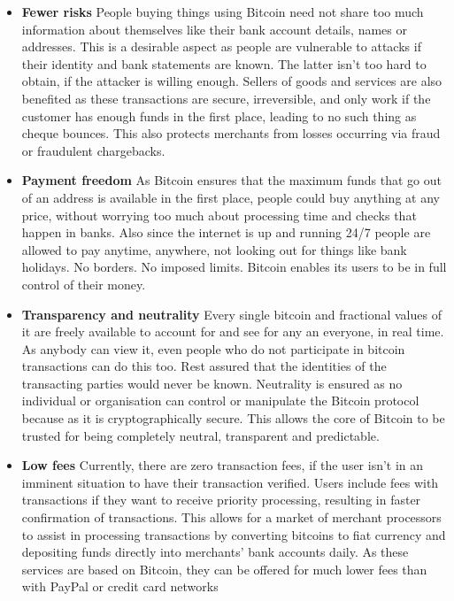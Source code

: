 \documentclass[12pt,a4paper]{report}
\begin{document}
\begin{justify}
\begin{itemize}
 \item \textbf{Fewer risks} \newline People buying things using Bitcoin need not share too much information about themselves like their bank account details, names or addresses. This is a desirable aspect as people are vulnerable to attacks if their identity and bank statements are known. \newline 
 The latter isn't too hard  to obtain, if the attacker is willing enough.
 Sellers of goods and services are also benefited as these transactions are secure, irreversible, and only work if the customer has enough funds in the first place, leading to no such thing as cheque bounces. This also protects merchants from losses occurring via fraud or fraudulent chargebacks.
  
  \vspace{10mm}
  \item \textbf{Payment freedom} \newline
  As Bitcoin ensures that the maximum funds that go out of an address is available in the first place, people could buy anything at any price, without worrying too much about processing time and checks that happen in banks. Also since the internet is up and running 24/7 people are allowed to pay anytime, anywhere, not looking out for things like bank holidays. No borders. No imposed limits. Bitcoin enables its users to be in full control of their money.
  \vspace{10mm}

 \item \textbf{Transparency and neutrality} \newline 
 Every single bitcoin and fractional values of it are freely available to account for and see for any an everyone, in real time. As anybody can view it, even people who do not participate in bitcoin transactions can do this too. Rest assured that the identities of the transacting parties would never be known.\newline
 Neutrality is ensured as no individual or organisation can control or manipulate the Bitcoin protocol because as it is cryptographically secure. This allows the core of Bitcoin to be trusted for being completely neutral, transparent and predictable.
 
  \vspace{10mm}
 
  
  \item \textbf{Low fees} \newline 
  Currently, there are zero transaction fees, if the user isn't in an imminent situation to have their transaction verified. Users include fees with transactions if they want to receive priority processing, resulting in faster confirmation of transactions. This allows for a market of merchant processors to assist in processing transactions by converting bitcoins to fiat currency and depositing funds directly into merchants' bank accounts daily. As these services are based on Bitcoin, they can be offered for much lower fees than with PayPal or credit card networks
  

\end{itemize}
\end{justify}
\end{document}
